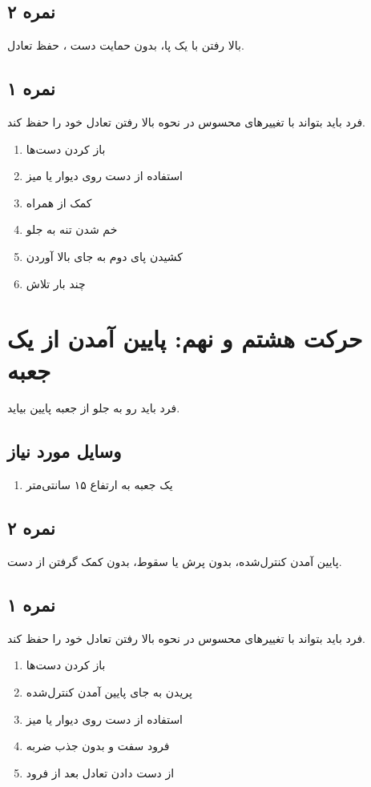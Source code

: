 \documentclass[12pt]{report}
\begin{document}
	\subsection*{نمره ۲}
	بالا رفتن با یک پا، بدون حمایت دست ، حفظ تعادل.
	\subsection*{نمره ۱}
	فرد باید بتواند با تغییر‌های محسوس در نحوه بالا رفتن تعادل خود را حفظ کند.
	\begin{enumerate}
		\item باز کردن دست‌ها
		\item استفاده از دست روی دیوار یا میز
		\item کمک از همراه
		\item خم شدن تنه به جلو
		\item کشیدن پای دوم به جای بالا آوردن
		\item چند بار تلاش
	\end{enumerate}
	\newpage
	
	\section*{حرکت هشتم و نهم: پایین آمدن از یک جعبه}
	فرد باید رو به جلو از جعبه پایین بیاید.
	\subsection*{وسایل مورد نیاز}
	\begin{enumerate}
		\item یک جعبه به ارتفاع ۱۵ سانتی‌متر
	\end{enumerate}
	\subsection*{نمره ۲}
	پایین آمدن کنترل‌شده، بدون پرش یا سقوط،‌ بدون کمک گرفتن از دست.
	\subsection*{نمره ۱}
	فرد باید بتواند با تغییر‌های محسوس در نحوه بالا رفتن تعادل خود را حفظ کند.
	\begin{enumerate}
		\item باز کردن دست‌ها
		\item پریدن به جای پایین آمدن کنترل‌شده
		\item استفاده از دست روی دیوار یا میز
		\item فرود سفت و بدون جذب ضربه
		\item از دست دادن تعادل بعد از فرود
	\end{enumerate}
	\newpage
	
\end{document}
